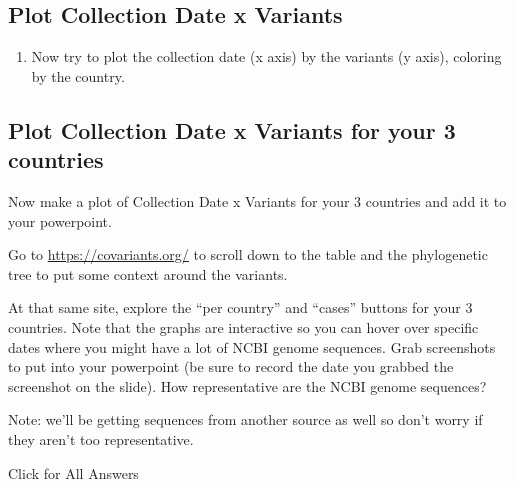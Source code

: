 \documentclass[
]{book}
\providecommand{\tightlist}{%
  \setlength{\itemsep}{0pt}\setlength{\parskip}{0pt}}
\begin{document}
\hypertarget{plot-collection-date-x-variants}{%
\subsection{Plot Collection Date x Variants}\label{plot-collection-date-x-variants}}

\begin{enumerate}
\def\labelenumi{\arabic{enumi}.}
\setcounter{enumi}{15}
\tightlist
\item
  Now try to plot the collection date (x axis) by the variants (y axis), coloring by the country.
\end{enumerate}

\hypertarget{plot-collection-date-x-variants-for-your-3-countries}{%
\subsection{Plot Collection Date x Variants for your 3 countries}\label{plot-collection-date-x-variants-for-your-3-countries}}

Now make a plot of Collection Date x Variants for your 3 countries and add it to your powerpoint.

Go to \url{https://covariants.org/} to scroll down to the table and the phylogenetic tree to put some context around the variants.

At that same site, explore the ``per country'' and ``cases'' buttons for your 3 countries. Note that the graphs are interactive so you can hover over specific dates where you might have a lot of NCBI genome sequences. Grab screenshots to put into your powerpoint (be sure to record the date you grabbed the screenshot on the slide). How representative are the NCBI genome sequences?

Note: we'll be getting sequences from another source as well so don't worry if they aren't too representative.

Click for All Answers
\end{document}
